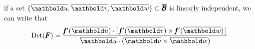 if a set $\{\overline{\vto{u}},\overline{\vto{v}},\overline{\vto{w}}\}\subset \tnr{\overline{\mathcal{B}}}$ is linearly independent, we can write that 
\begin{equation}
\hdet{\tnr{F}}=\dfrac{\fua{\tnr{\mathit{f}}'}{\overline{\vto{u}}}\cdot[\,\fua{\tnr{\mathit{f}}'}{\overline{\vto{v}}}\times\fua{\tnr{\mathit{f}}'}{\overline{\vto{w}}}\,]}{\overline{\vto{u}}\cdot(\overline{\vto{v}}\times\overline{\vto{w}})}
\end{equation}







 

